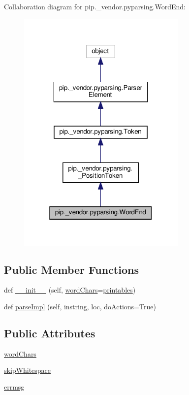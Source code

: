 Collaboration diagram for pip.\+\_\+vendor.\+pyparsing.\+Word\+End\+:
\nopagebreak
\begin{figure}[H]
\begin{center}
\leavevmode
\includegraphics[width=235pt]{classpip_1_1__vendor_1_1pyparsing_1_1WordEnd__coll__graph}
\end{center}
\end{figure}
\subsection*{Public Member Functions}
\begin{DoxyCompactItemize}
\item 
def \hyperlink{classpip_1_1__vendor_1_1pyparsing_1_1WordEnd_a4e39d8445513f1ee87c3873251ecbae2}{\+\_\+\+\_\+init\+\_\+\+\_\+} (self, \hyperlink{classpip_1_1__vendor_1_1pyparsing_1_1WordEnd_a6843cb292471acdc76d98d77a59b79b2}{word\+Chars}=\hyperlink{namespacepip_1_1__vendor_1_1pyparsing_ac9075b160f22a7b6557fff8c2fb1f329}{printables})
\item 
def \hyperlink{classpip_1_1__vendor_1_1pyparsing_1_1WordEnd_ad2ab738df98e46741db8b93e48fa4335}{parse\+Impl} (self, instring, loc, do\+Actions=True)
\end{DoxyCompactItemize}
\subsection*{Public Attributes}
\begin{DoxyCompactItemize}
\item 
\hyperlink{classpip_1_1__vendor_1_1pyparsing_1_1WordEnd_a6843cb292471acdc76d98d77a59b79b2}{word\+Chars}
\item 
\hyperlink{classpip_1_1__vendor_1_1pyparsing_1_1WordEnd_aaf60605e150e1092bd27a1e2aab4762b}{skip\+Whitespace}
\item 
\hyperlink{classpip_1_1__vendor_1_1pyparsing_1_1WordEnd_a799cd8fb419744987c6696d54582abc4}{errmsg}
\end{DoxyCompactItemize}
